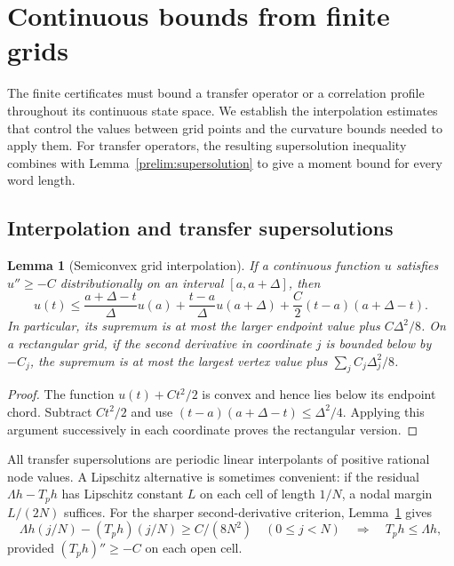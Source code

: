 \documentclass[11pt,a4paper]{article}
\theoremstyle{paperplain}
\newtheorem{lemma}[theorem]{Lemma}
\numberwithin{equation}{section}
\begin{document}
\appendix
{}
\section{Continuous bounds from finite grids}\label{app:continuous}

The finite certificates must bound a transfer operator or a correlation
profile throughout its continuous state space. We establish the
interpolation estimates that control the values between grid points and
the curvature bounds needed to apply them. For transfer operators, the
resulting supersolution inequality combines with
Lemma~\ref{prelim:supersolution} to give a moment bound for every word length.

\subsection{Interpolation and transfer supersolutions}

\begin{lemma}[Semiconvex grid interpolation]\label{prelim:grid}
If a continuous function $u$ satisfies $u''\geqslant-C$ distributionally
on an interval $[a,a+\Delta]$, then
\[
 u(t)\leqslant
 \frac{a+\Delta-t}{\Delta}u(a)+
 \frac{t-a}{\Delta}u(a+\Delta)
 +\frac C2(t-a)(a+\Delta-t).
\]
In particular, its supremum is at most the larger endpoint value plus
$C\Delta^2/8$. On a rectangular grid, if the second derivative in coordinate
$j$ is bounded below by $-C_j$, the supremum is at most the largest vertex
value plus $\sum_jC_j\Delta_j^2/8$.
\end{lemma}
\begin{proof}
The function $u(t)+Ct^2/2$ is convex and hence lies below its endpoint
chord. Subtract $Ct^2/2$ and use
$(t-a)(a+\Delta-t)\leqslant\Delta^2/4$. Applying this argument successively
in each coordinate proves the rectangular version.
\end{proof}

All transfer supersolutions are periodic linear interpolants of positive
rational node values. A Lipschitz alternative is sometimes convenient:
if the residual $\Lambda h-T_ph$ has Lipschitz constant $L$ on each
cell of length $1/N$, a nodal margin $L/(2N)$ suffices.
For the sharper second-derivative criterion, Lemma~\ref{prelim:grid} gives
\begin{equation}\label{prelim:semiconvex}
 \Lambda h(j/N)-(T_ph)(j/N)\geqslant C/(8N^2)
 \quad(0\leqslant j<N)
 \quad\Longrightarrow\quad T_ph\leqslant\Lambda h,
\end{equation}
provided $(T_ph)''\geqslant-C$ on each open cell.
\end{document}
